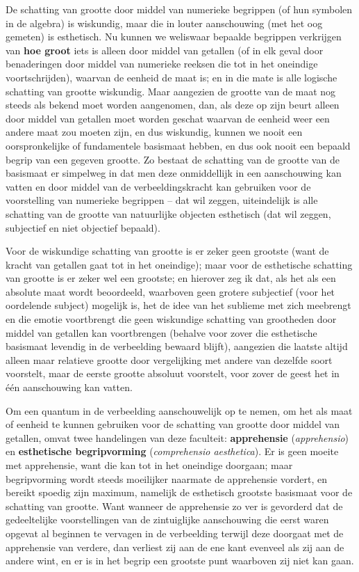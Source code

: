 De schatting van grootte door middel van numerieke begrippen (of hun symbolen in de algebra) is wiskundig, maar die in louter aanschouwing (met het oog gemeten) is esthetisch. Nu kunnen we weliswaar bepaalde begrippen verkrijgen van \textbf{hoe groot} iets is alleen door middel van getallen (of in elk geval door benaderingen door middel van numerieke reeksen die tot in het oneindige voortschrijden), waarvan de eenheid de maat is; en in die mate is alle logische schatting van grootte wiskundig. Maar aangezien de grootte van de maat nog steeds als bekend moet worden aangenomen, dan, als deze op zijn beurt alleen door middel van getallen moet worden geschat waarvan de eenheid weer een andere maat zou moeten zijn, en dus wiskundig, kunnen we nooit een oorspronkelijke of fundamentele basismaat hebben, en dus ook nooit een bepaald begrip van een gegeven grootte. Zo bestaat de schatting van de grootte van de basismaat er simpelweg in dat men deze onmiddellijk in een aanschouwing kan vatten en door middel van de verbeeldingskracht kan gebruiken voor de voorstelling van numerieke begrippen – dat wil zeggen, uiteindelijk is alle schatting van de grootte van natuurlijke objecten esthetisch (dat wil zeggen, subjectief en niet objectief bepaald).

Voor de wiskundige schatting van grootte is er zeker geen grootste (want de kracht van getallen gaat tot in het oneindige); maar voor de esthetische schatting van grootte is er zeker wel een grootste; en hierover zeg ik dat, als het als een absolute maat wordt beoordeeld, waarboven geen grotere subjectief (voor het oordelende subject) mogelijk is, het de idee van het sublieme met zich meebrengt en die emotie voortbrengt die geen wiskundige schatting van grootheden door middel van getallen kan voortbrengen (behalve voor zover die esthetische basismaat levendig in de verbeelding bewaard blijft), aangezien die laatste altijd alleen maar relatieve grootte door vergelijking met andere van dezelfde soort voorstelt, maar de eerste grootte absoluut voorstelt, voor zover de geest het in één aanschouwing kan vatten.

Om een quantum in de verbeelding aanschouwelijk op te nemen, om het als maat of eenheid te kunnen gebruiken voor de schatting van grootte door middel van getallen, omvat twee handelingen van deze faculteit: \textbf{apprehensie} (\textit{apprehensio}) en \textbf{esthetische begripvorming} (\textit{comprehensio aesthetica}). Er is geen moeite met apprehensie, want die kan tot in het oneindige doorgaan; maar begripvorming wordt steeds moeilijker naarmate de apprehensie vordert, en bereikt spoedig zijn maximum, namelijk de esthetisch grootste basismaat voor de schatting van grootte. Want wanneer de apprehensie zo ver is gevorderd dat de gedeeltelijke voorstellingen van de zintuiglijke aanschouwing die eerst waren opgevat al beginnen te vervagen in de verbeelding terwijl deze doorgaat met de apprehensie van verdere, dan verliest zij aan de ene kant evenveel als zij aan de andere wint, en er is in het begrip een grootste punt waarboven zij niet kan gaan.

